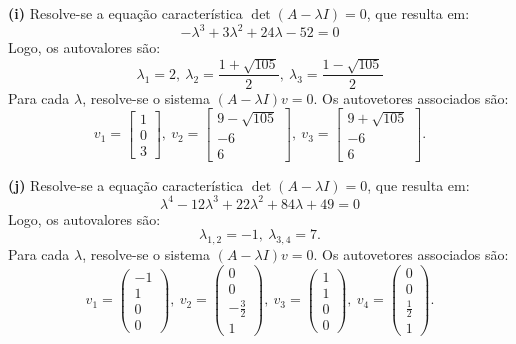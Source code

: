 \begin{resolution}
  {\bf (i)} \;
  Resolve-se a equação característica \( \det(A - \lambda I) = 0 \), que resulta em:
  \[
    -\lambda^3+3\lambda^2+24\lambda-52=0
  \]
  Logo, os autovalores são:
  \[
    \lambda_1=2,\:\lambda_2=\frac{1+\sqrt{105}}{2},\:\lambda_3=\frac{1-\sqrt{105}}{2}
  \]
  Para cada \(\lambda\), resolve-se o sistema \((A - \lambda I)v = 0\). Os autovetores associados são:
  \[
    v_1 = \begin{bmatrix}1\\ 0\\ 3\end{bmatrix},\:
    v_2 = \begin{bmatrix}9-\sqrt{105}\\ -6\\ 6\end{bmatrix},\:
    v_3 = \begin{bmatrix}9+\sqrt{105}\\ -6\\ 6\end{bmatrix}.
  \]

  {\bf (j)} \;
  Resolve-se a equação característica \( \det(A - \lambda I) = 0 \), que resulta em:
  \[
    \lambda^4-12\lambda^3+22\lambda^2+84\lambda+49=0
  \]
  Logo, os autovalores são:
  \[
    \lambda_{1, 2}=-1,\:\lambda_{3, 4}=7.
  \]
  Para cada \(\lambda\), resolve-se o sistema \((A - \lambda I)v = 0\). Os autovetores associados são:
  \[
    v_1 = \begin{pmatrix}-1\\ 1\\ 0\\ 0\end{pmatrix},\:
    v_2 = \begin{pmatrix}0\\ 0\\ -\frac{3}{2}\\ 1\end{pmatrix},\:
    v_3 = \begin{pmatrix}1\\ 1\\ 0\\ 0\end{pmatrix},\:
    v_4 = \begin{pmatrix}0\\ 0\\ \frac{1}{2}\\ 1\end{pmatrix}.
  \]


\end{resolution}
